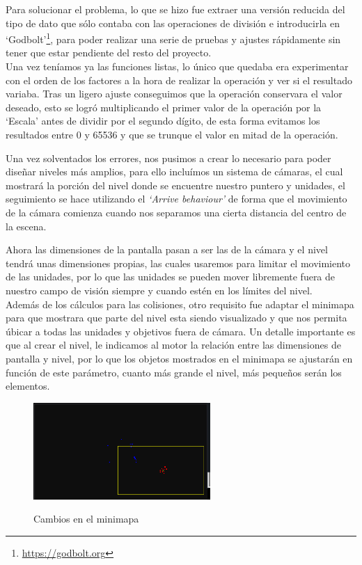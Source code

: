 Para solucionar el problema, lo que se hizo fue extraer una versión reducida del tipo de dato que sólo contaba
con las operaciones de división e introducirla en `Godbolt'\footnote{\url{https://godbolt.org}}, para poder
realizar una serie de pruebas y ajustes rápidamente sin tener que estar pendiente del resto del proyecto. \\
Una vez teníamos ya las funciones listas, lo único que quedaba era experimentar con el orden de los
factores a la hora de realizar la operación y ver si el resultado variaba. Tras un ligero ajuste conseguimos
que la operación conservara el valor deseado, esto se logró multiplicando el primer valor de la operación
por la `Escala' antes de dividir por el segundo dígito, de esta forma evitamos los resultados entre 0 y 65536
y que se trunque el valor en mitad de la operación.

Una vez solventados los errores, nos pusimos a crear lo necesario para poder diseñar niveles más amplios,
para ello incluímos un sistema de cámaras, el cual mostrará la porción del nivel donde se encuentre
nuestro puntero y unidades, el seguimiento se hace utilizando el \textit{`Arrive behaviour'} de forma que
el movimiento de la cámara comienza cuando nos separamos una cierta distancia del centro de la escena.

Ahora las dimensiones de la pantalla pasan a ser las de la cámara y el nivel tendrá unas dimensiones
propias, las cuales usaremos para limitar el movimiento de las unidades, por lo que las unidades se pueden
mover libremente fuera de nuestro campo de visión siempre y cuando estén en los límites del nivel. \\
Además de los cálculos para las colisiones, otro requisito fue adaptar el minimapa para que mostrara
que parte del nivel esta siendo visualizado y que nos permita úbicar a todas las unidades y objetivos
fuera de cámara. Un detalle importante es que al crear el nivel, le indicamos al motor la relación
entre las dimensiones de pantalla y nivel, por lo que los objetos mostrados en el minimapa se ajustarán
en función de este parámetro, cuanto más grande el nivel, más pequeños serán los elementos.

\begin{figure}[ht]
\centering
\includegraphics[width=0.6\textwidth]{imagenes/diario_desarrollo/minimap2.png}\\
\caption{Cambios en el minimapa}
\label{fig:minimap2}
\end{figure}

